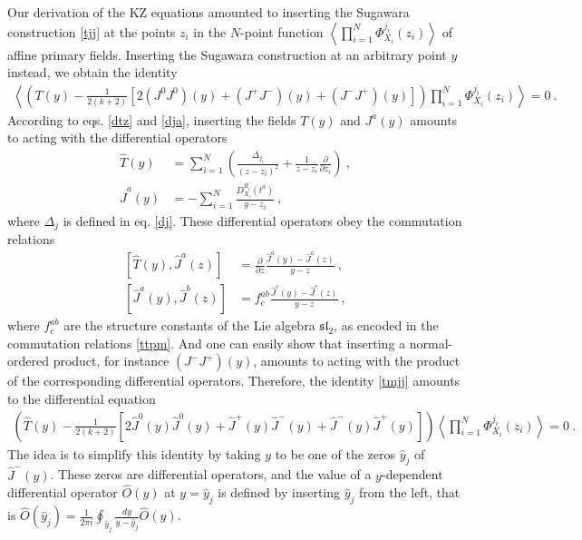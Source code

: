\documentclass[12pt,a4paper,notitlepage]{report}
\numberwithin{equation}{section}
\theoremstyle{break}
\begin{document}
Our derivation of the KZ equations amounted to inserting the Sugawara construction \eqref{tjj}  at the points $z_i$ in the $N$-point function $\left\langle \prod_{i=1}^N \Phi^{j_i}_{X_i}(z_i)\right\rangle $ of affine primary fields.
Inserting the Sugawara construction at an arbitrary point $y$ instead, we obtain the identity
\begin{align}
 \left\langle \left(T(y)  - \frac{1}{2(k+2)}\left[ 2(J^0J^0)(y)+(J^+J^-)(y)+(J^-J^+)(y)\right]\right) \prod_{i=1}^N \Phi^{j_i}_{X_i}(z_i)\right\rangle = 0\ .
\label{tmjj}
\end{align}
According to eqs. \eqref{dtz} and \eqref{dja}, inserting the fields $T(y)$ and $J^a(y)$ amounts to acting with the differential operators 
\begin{align}
 \hat{T}(y) &= \sum_{i=1}^N \left(\frac{\Delta_{j_i}}{(z-z_i)^2} + \frac{1}{z-z_i}{\frac{\partial}{\partial z_i}}\right)\ ,
\label{tcy}
\\
 \hat{J}^a(y) &= - \sum_{i=1}^N \frac{D^{R_i}_{X_i}(t^a)}{y-z_i}\ ,
\label{jay}
\end{align}
where $\Delta_j$ is defined in eq. \eqref{dj}.
These differential operators obey the commutation relations
\begin{align}
 \left[\hat{T}(y),\hat{J}^a(z)\right] &= {\frac{\partial}{\partial z}} \frac{\hat{J}^a(y)-\hat{J}^a(z)}{y-z}\ ,
\label{dtd}
\\
 \left[ \hat{J}^a(y),\hat{J}^b(z)\right] &= f^{ab}_c \frac{\hat{J}^c(y)-\hat{J}^c(z)}{y-z}\ ,
\label{ddd}
\end{align}
where $f^{ab}_c$ are the structure constants of the Lie algebra $\mathfrak{sl}_2$, as encoded in the commutation relations \eqref{ttpm}.
And one can easily show that inserting a normal-ordered product, for instance $(J^-J^+)(y)$, amounts to acting with the product of the corresponding differential operators.
Therefore, the identity \eqref{tmjj} amounts to the differential equation
\begin{align}
 \left(\hat{T}(y) -\frac{1}{2(k+2)}\left[ 2\hat{J}^0(y)\hat{J}^0(y) +\hat{J}^+(y)\hat{J}^-(y)+\hat{J}^-(y)\hat{J}^+(y)\right]\right) \left\langle \prod_{i=1}^N \Phi^{j_i}_{X_i}(z_i)\right\rangle=0\ .
\end{align}
The idea is to simplify this identity by taking $y$ to be one of the zeros $\hat{y}_j$ of $ \hat{J}^-(y)$.
These zeros are differential operators, and the value of a $y$-dependent differential operator $\hat{O}(y)$ at $y=\hat{y}_j$ is defined by inserting $\hat{y}_j$ from the left, that is $ \hat{O}(\hat{y}_j) = \frac{1}{2\pi i}\oint_{\hat{y}_j} \frac{dy}{y-\hat{y}_j} \hat{O}(y) $.
\end{document}
